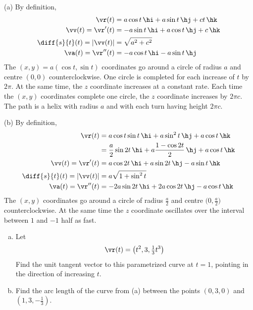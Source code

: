 \begin{solution}
(a) By definition,
\begin{align*}
\vr(t)&= a \cos t\,\hi+a\sin t\,\hj+ct\,\hk\\
\vv(t)=\vr'(t)&= -a \sin t\,\hi+a\cos t\,\hj+c\,\hk\\
\diff{s}{t}(t)=|\vv(t)|&= \sqrt{a^2+c^2}\\
\va(t)=\vr''(t)&= -a \cos t\,\hi-a\sin t\,\hj
\end{align*}
The $(x,y)= a(\cos t,\sin t)$ coordinates go 
     around a circle of radius $a$ and centre $(0,0)$ counterclockwise.
     One circle is completed for each increase of $t$ by $2\pi$.
     At the same time, the $z$ coordinate increases at a constant rate. 
     Each time the $(x,y)$ coordinates complete one circle, the $z$ 
     coordinate increases by $2 \pi c$.
The path is a helix with radius $a$ and with each turn having height $2\pi c$.

(b) By definition,
\begin{align*}
\vr(t)&= a \cos t\sin t\,\hi +a\sin^2 t\,\hj+a\cos t\,\hk\\
      &= \frac{a}{2} \sin 2t\,\hi+a\frac{1-\cos 2t}{2}\,\hj+a\cos t\,\hk\\
\vv(t)=\vr'(t)&= a \cos 2t\,\hi +a\sin 2t\,\hj-a\sin t\,\hk\\
\diff{s}{t}(t)=|\vv(t)|&= a\sqrt{1+\sin^2t}\\
\va(t)=\vr''(t)&= -2a \sin 2t\,\hi +2a\cos 2t\,\hj-a\cos t\,\hk
\end{align*}
The $(x,y)$ coordinates go around a circle of radius $\frac{a}{2}$ and
centre $\big(0,\frac{a}{2}\big)$ counterclockwise. At the same time the $z$ coordinate oscillates over the interval between $1$ and $-1$ half as fast.
\end{solution}

\begin{question}[M317 2013D] %

\begin{enumerate}[(a)]
\item
Let
\begin{equation*}
\vr(t) = \left(t^2 , 3, \tfrac{1}{3} t^3 \right) 
\end{equation*}
Find the unit tangent vector to this parametrized curve at $t = 1$, 
pointing in the direction of increasing $t$.
\item
Find the arc length of the curve from (a) between the points $(0, 3, 0)$ 
and $(1, 3, -\frac{1}{3})$.

\end{enumerate}
\end{question}

